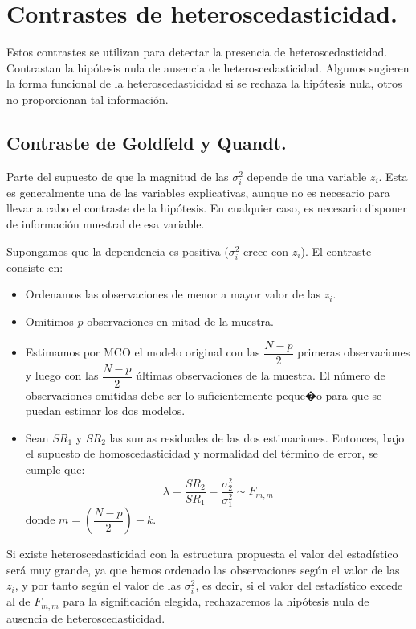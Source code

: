 \section{Contrastes de heteroscedasticidad.}

Estos contrastes se utilizan para detectar la presencia de heteroscedasticidad.
Contrastan la hip\'otesis nula de ausencia de heteroscedasticidad. Algunos
sugieren la forma funcional de la heteroscedasticidad si se rechaza
la hip\'otesis nula, otros no proporcionan tal informaci\'on.


\subsection{Contraste de Goldfeld y Quandt.}

Parte del supuesto de que la magnitud de las $\sigma_{i}^{2}$ depende
de una variable $z_{i}$. Esta es generalmente una de las variables
explicativas, aunque no es necesario para llevar a cabo el contraste
de la hip\'otesis. En cualquier caso, es necesario disponer de informaci\'on
muestral de esa variable.

Supongamos que la dependencia es positiva ($\sigma_{i}^{2}$ crece
con $z_{i}$). El contraste consiste en:
\begin{itemize}
\item Ordenamos las observaciones de menor a mayor valor de las $z_{i}$.
\item Omitimos $p$ observaciones en mitad de la muestra.
\item Estimamos por MCO el modelo original con las $\dfrac{N-p}{2}$ primeras
observaciones y luego con las $\dfrac{N-p}{2}$ \'ultimas observaciones
de la muestra. El n\'umero de observaciones omitidas debe ser lo suficientemente
peque�o para que se puedan estimar los dos modelos.
\item Sean $SR_{1}$ y $SR_{2}$ las sumas residuales de las dos estimaciones.
Entonces, bajo el supuesto de homoscedasticidad y normalidad del t\'ermino
de error, se cumple que:
\[
\lambda=\dfrac{SR_{2}}{SR_{1}}=\dfrac{\sigma_{2}^{2}}{\sigma_{1}^{2}}\sim F_{m,m}
\]
 donde $m=\left(\dfrac{N-p}{2}\right)-k$.
\end{itemize}
Si existe heteroscedasticidad con la estructura propuesta el valor
del estad\'istico ser\'a muy grande, ya que hemos ordenado las observaciones
seg\'un el valor de las $z_{i}$, y por tanto seg\'un el valor de las
$\sigma_{i}^{2}$, es decir, si el valor del estad\'istico excede al
de $F_{m,m}$ para la significaci\'on elegida, rechazaremos la hip\'otesis
nula de ausencia de heteroscedasticidad.

